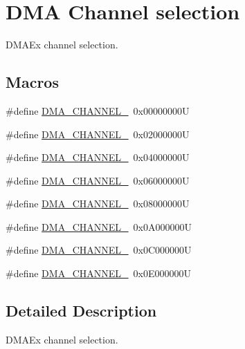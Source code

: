 \hypertarget{group___d_m_a_ex___channel__selection}{}\section{D\+MA Channel selection}
\label{group___d_m_a_ex___channel__selection}


D\+M\+A\+Ex channel selection.  


\subsection*{Macros}
\begin{DoxyCompactItemize}
\item 
\#define \mbox{\hyperlink{group___d_m_a_ex___channel__selection_gabd7de138931e93a90fc6c4eab5916bbe}{D\+M\+A\+\_\+\+C\+H\+A\+N\+N\+E\+L\+\_}}~0x00000000U
\item 
\#define \mbox{\hyperlink{group___d_m_a_ex___channel__selection_ga283364370e9876af6406b9fa70e2944f}{D\+M\+A\+\_\+\+C\+H\+A\+N\+N\+E\+L\+\_}}~0x02000000U
\item 
\#define \mbox{\hyperlink{group___d_m_a_ex___channel__selection_ga9688f3e78cbc2109d214b7ca049e22df}{D\+M\+A\+\_\+\+C\+H\+A\+N\+N\+E\+L\+\_}}~0x04000000U
\item 
\#define \mbox{\hyperlink{group___d_m_a_ex___channel__selection_gac689673fec4d72ede49a0d657e3a7e70}{D\+M\+A\+\_\+\+C\+H\+A\+N\+N\+E\+L\+\_}}~0x06000000U
\item 
\#define \mbox{\hyperlink{group___d_m_a_ex___channel__selection_ga51b51f5b39e23b28ad99520ad5be596f}{D\+M\+A\+\_\+\+C\+H\+A\+N\+N\+E\+L\+\_}}~0x08000000U
\item 
\#define \mbox{\hyperlink{group___d_m_a_ex___channel__selection_gafbaa82f3cff89858e50363c04ed0cca0}{D\+M\+A\+\_\+\+C\+H\+A\+N\+N\+E\+L\+\_}}~0x0\+A000000U
\item 
\#define \mbox{\hyperlink{group___d_m_a_ex___channel__selection_gad23679661d8da3bc1aaacc62f99821f7}{D\+M\+A\+\_\+\+C\+H\+A\+N\+N\+E\+L\+\_}}~0x0\+C000000U
\item 
\#define \mbox{\hyperlink{group___d_m_a_ex___channel__selection_ga77ff4e8675a3991feb20e385242f34ab}{D\+M\+A\+\_\+\+C\+H\+A\+N\+N\+E\+L\+\_}}~0x0\+E000000U
\end{DoxyCompactItemize}


\subsection{Detailed Description}
D\+M\+A\+Ex channel selection. 



